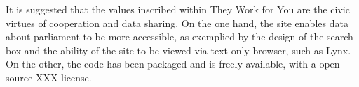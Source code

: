 It is suggested that the values inscribed within They Work for You are the civic virtues of cooperation and data sharing.
On the one hand, the site enables data about parliament to be more accessible, as exemplied by the design of the search box and the ability of the site to be viewed via text only browser, such as Lynx. 
On the other, the code has been packaged and is freely available, with a open source XXX license. 